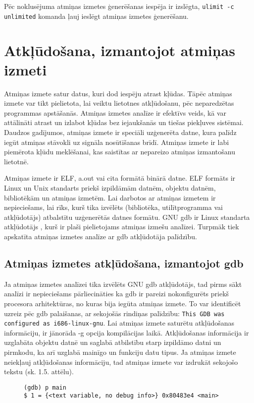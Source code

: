  Pēc noklusējuma atmiņas izmetes ģenerēšanas iespēja ir izslēgta,  \texttt{ulimit -c unlimited} komanda ļauj ieslēgt atmiņas izmetes ģenerēšanu.

\section{Atkļūdošana, izmantojot atmiņas izmeti}
Atmiņas izmete satur datus, kuri dod iespēju atrast kļūdas. Tāpēc atmiņas izmete var tikt pielietota, lai veiktu lietotnes atkļūdošanu, pēc neparedzētas programmas apstāšanās.
Atmiņas izmetes analīze ir efektīvs veids, kā var attālināti atrast un izlabot kļūdas bez iejaukšanās un tiešas piekļuves sistēmai.
Daudzos gadījumos, atmiņas izmete ir speciāli uzģenerēta datne, kura palīdz iegūt atmiņas stāvokli uz signāla nosūtīšanas brīdī.
Atmiņas izmete ir labi piemērota kļūdu meklēšanai, kas saistītas ar nepareizo atmiņas izmantošanu lietotnē.

Atmiņas izmete ir ELF, a.out vai cita formātā binārā  datne. 
ELF formāts ir Linux un Unix standarts priekš izpildāmām datnēm, objektu datnēm, bibliotēkām un atmiņas izmetēm.
Lai darbotos ar atmiņas izmetem ir nepieciešams, lai rīks, kurš tika izvēlēts (bibliotēka, utilītprogramma vai atkļūdotājs) atbalstītu uzģenerētās datnes formātu.
GNU gdb ir  Linux standarta atkļūdotājs \cite{MWMK}, kurš ir plaši pielietojams atmiņas izmešu analīzei. 
Turpmāk tiek apskatīta atmiņas izmetes analīze ar gdb atkļūdotāja palīdzību.

\subsection{Atmiņas izmetes atkļūdošana, izmantojot gdb }
 \label{subsec:debugg_gdb}
Ja atmiņas izmetes analīzei tika izvēlēts GNU gdb atkļūdotājs, tad pirms sākt analīzi ir nepieciešams pārliecināties ka gdb ir pareizi nokonfigurēts priekš procesora arhitektūras, no kuras bija iegūta atmiņas izmete.
To var identificēt uzreiz pēc gdb palaišanas, ar sekojošās rindiņas palīdzību: \texttt{This GDB was configured as i686-linux-gnu}.  
Lai atmiņas izmete saturētu atkļūdošanas informāciju, ir jānorāda -g opcija kompilācijas laikā.
Atkļūdošanas informācija ir uzglabāta objektu datnē un saglabā atbilstību starp izpildāmo datni un pirmkodu, ka arī uzglabā mainīgo un funkciju datu tipus.
Ja atmiņas izmete neiekļauj atkļūdošanas informāciju, tad atmiņas izmete var izdrukāt sekojošo tekstu (sk. 1.5. attēlu).

\begin{figure}[h]
\begin{lstlisting}
(gdb) p main
$ 1 = {<text variable, no debug info>} 0x80483e4 <main>
\end{lstlisting}
\caption{\textbf{\fontsize{11}{12}\selectfont {Atmiņas izmete nesatur atkļūdošanas informāciju}}}
\end{figure}

